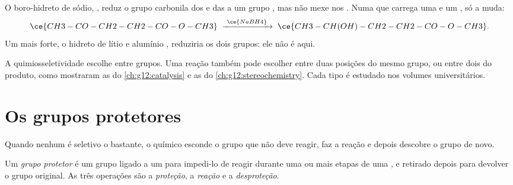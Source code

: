 \begin{example}\label{ex:g12:synthesis-strategy:nabh4}
O boro-hidreto de sódio, , reduz o grupo carbonila dos
 e das  a um grupo , mas não mexe nos .
Numa  que carrega uma  e um , só a  muda:
\[
  \ce{CH3-CO-CH2-CH2-CO-O-CH3}
  \;\xrightarrow{\ \ce{NaBH4}\ }\;
  \ce{CH3-CH(OH)-CH2-CH2-CO-O-CH3} .
\]
Um  mais forte, o hidreto de lítio e alumínio ,
reduziria os dois grupos: ele não é  aqui.
\end{example}

\begin{remark}\label{rem:g12:synthesis-strategy:kinds}
A quimiosseletividade escolhe entre grupos. Uma reação também pode
escolher entre duas posições do mesmo grupo, ou entre dois
 do produto, como mostraram as  do
\cref{ch:g12:catalysis} e as   do
\cref{ch:g12:stereochemistry}. Cada tipo é estudado nos volumes
universitários.
\end{remark}

\section{Os grupos protetores}

Quando nenhum  é seletivo o bastante, o químico esconde o grupo
que não deve reagir, faz a reação e depois descobre o grupo de novo.

\begin{definition}\label{def:g12:synthesis-strategy:protecting-group}
Um \emph{grupo protetor} é um grupo ligado a um
 para impedi-lo de reagir durante uma ou mais etapas de
uma , e retirado depois para devolver o grupo original. As três
operações são a \emph{proteção}, a \emph{reação} e a
\emph{desproteção}.
\end{definition}

